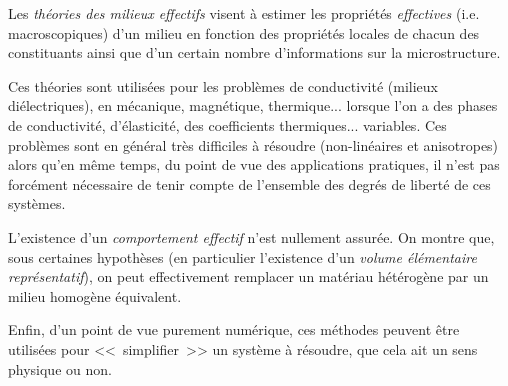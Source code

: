 \medskip
\begin{histoire}%
Les \emph{théories des milieux effectifs} visent à estimer les propriétés \emph{effectives} (i.e. macroscopiques) d'un
milieu en fonction des propriétés locales de chacun des constituants ainsi
que d'un certain nombre d'informations sur la microstructure.


\medskip
{}

\medskip
Ces théories sont utilisées pour les problèmes de conductivité (milieux diélectriques),
en mécanique, magnétique, thermique... lorsque l'on a des phases de conductivité,
d'élasticité, des coefficients thermiques... variables.
Ces problèmes sont en général très difficiles à résoudre (non-linéaires et anisotropes)
alors qu'en même temps, du point de vue des applications pratiques, il n'est pas forcément
nécessaire de tenir compte de l'ensemble des degrés de liberté de ces systèmes.

\medskip
L'existence d'un \emph{comportement effectif} n'est nullement assurée.
On montre que, sous certaines hypothèses (en particulier l'existence d'un \emph{volume
élémentaire représentatif}), on peut effectivement
remplacer un matériau hétérogène par un milieu homogène équivalent.

Enfin, d'un point de vue purement numérique, ces méthodes peuvent être
utilisées pour <<~simplifier~>> un système à résoudre, que cela ait un sens
physique ou non.
\end{histoire}

